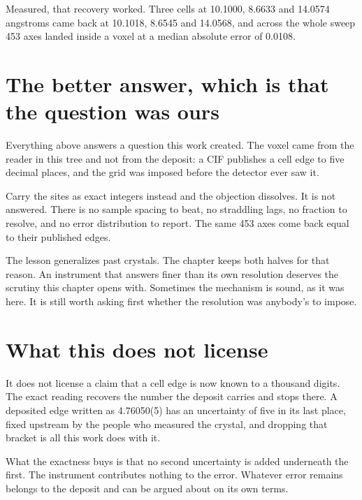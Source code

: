 Measured, that recovery worked. Three cells at 10.1000, 8.6633 and 14.0574 angstroms came back at 10.1018, 8.6545 and 14.0568, and across the whole sweep 453 axes landed inside a voxel at a median absolute error of 0.0108.

\section{The better answer, which is that the question was ours}

Everything above answers a question this work created. The voxel came from the reader in this tree and not from the deposit: a CIF publishes a cell edge to five decimal places, and the grid was imposed before the detector ever saw it.

Carry the sites as exact integers instead and the objection dissolves. It is not answered. There is no sample spacing to beat, no straddling lags, no fraction to resolve, and no error distribution to report. The same 453 axes come back equal to their published edges.

The lesson generalizes past crystals. The chapter keeps both halves for that reason. An instrument that answers finer than its own resolution deserves the scrutiny this chapter opens with. Sometimes the mechanism is sound, as it was here. It is still worth asking first whether the resolution was anybody's to impose.

\section{What this does not license}

It does not license a claim that a cell edge is now known to a thousand digits. The exact reading recovers the number the deposit carries and stops there. A deposited edge written as 4.76050(5) has an uncertainty of five in its last place, fixed upstream by the people who measured the crystal, and dropping that bracket is all this work does with it.

What the exactness buys is that no second uncertainty is added underneath the first. The instrument contributes nothing to the error. Whatever error remains belongs to the deposit and can be argued about on its own terms.
